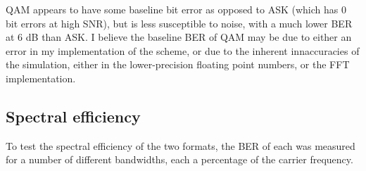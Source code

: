 \documentclass{article}
\begin{document}
QAM appears to have some baseline bit error as opposed to ASK (which has 0 bit errors at high SNR), but is less susceptible to noise, with a much lower BER at 6 dB than ASK. I believe the baseline BER of QAM may be due to either an error in my implementation of the scheme, or due to the inherent innaccuracies of the simulation, either in the lower-precision floating point numbers, or the FFT implementation.

\subsection{Spectral efficiency}
To test the spectral efficiency of the two formats, the BER of each was measured for a number of different bandwidths, each a percentage of the carrier frequency. 
\end{document}
